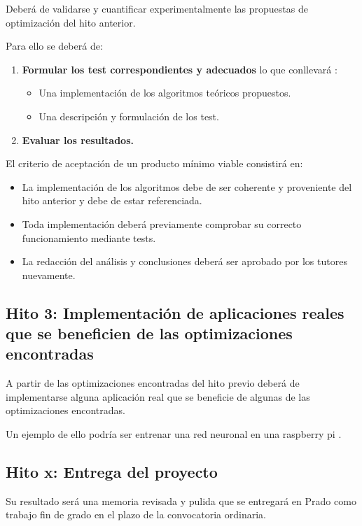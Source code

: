 Deberá de validarse y cuantificar experimentalmente las propuestas de optimización del hito anterior. 

Para ello  se deberá de: 
\begin{enumerate}
    \item \textbf{Formular los test correspondientes y adecuados} lo que conllevará : 
    \begin{itemize}
        \item Una implementación de los algoritmos teóricos propuestos.
        \item Una descripción y formulación de los test.
    \end{itemize}

    \item \textbf{Evaluar los resultados.}
\end{enumerate}

El criterio de aceptación de un producto mínimo viable consistirá en:
\begin{itemize}
    \item La implementación de los algoritmos debe de ser coherente y proveniente del hito anterior y debe de estar referenciada.
    \item  Toda implementación deberá previamente comprobar su correcto funcionamiento mediante tests.
    \item La redacción del análisis y conclusiones deberá ser aprobado por los tutores nuevamente.
\end{itemize}

\subsection*{Hito 3: Implementación de aplicaciones reales que se beneficien de las optimizaciones encontradas }

A partir de las optimizaciones encontradas del hito previo deberá de implementarse alguna aplicación real que se beneficie de algunas de las optimizaciones encontradas. 

Un ejemplo de ello podría ser entrenar una red neuronal en una raspberry pi .



\subsection*{Hito x: Entrega del proyecto}

Su resultado será una memoria revisada y pulida que se entregará en Prado como trabajo fin de grado en el plazo de la convocatoria ordinaria. 

